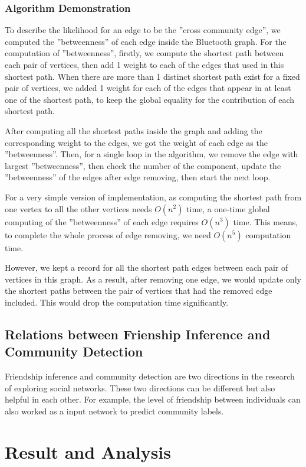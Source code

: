 \documentclass[11pt]{article}
\begin{document}
\subsubsection{Algorithm Demonstration} 
To describe the likelihood for an edge to be the ''cross community edge'', we computed the ''betweenness'' of each edge inside the Bluetooth graph. For the computation of ''betweenness'', firstly, we compute the shortest path between each pair of vertices, then add 1 weight to each of the edges that used in this shortest path. When there are more than 1 distinct shortest path exist for a fixed pair of vertices, we added 1 weight for each of the edges that appear in at least one of the shortest path, to keep the global equality for the contribution of each shortest path.

After computing all the shortest paths inside the graph and adding the corresponding weight to the edges, we got the weight of each edge as the ''betweenness''. Then, for a single loop in the algorithm, we remove the edge with largest ''betweenness'', then check the number of the component, update the ''betweenness'' of the edges after edge removing, then start the next loop.

For a very simple version of implementation, as computing the shortest path from one vertex to all the other vertices needs \(O(n^2)\) time, a one-time global computing of the ''betweenness'' of each edge requires \(O(n^3)\) time. This means, to complete the whole process of edge removing, we need \(O(n^5)\) computation time.

However, we kept a record for all the shortest path edges between each pair of vertices in this graph. As a result, after removing one edge, we would update only the shortest paths between the pair of vertices that had the removed edge included. This would drop the computation time significantly.  
\subsection{Relations between Frienship Inference and Community Detection}
Friendship inference and community detection are two directions in the research of exploring social networks. These two directions can be different but also helpful in each other. For example, the level of friendship between individuals can also worked as a input network to predict community labels.

\section{Result and Analysis} \label{result}
\end{document}
